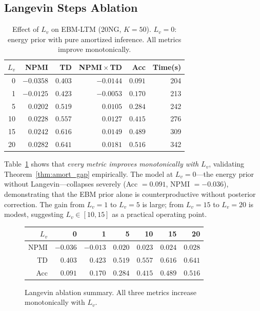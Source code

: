\documentclass[10pt]{article}
\newcommand{\best}[1]{\textbf{#1}}
\begin{document}
\subsection{Langevin Steps Ablation}
\label{sec:langevin_ablation}

\begin{table}[t]
\centering
\caption{Effect of $L_v$ on EBM-LTM (20NG, $K=50$).
    $L_v=0$: energy prior with pure amortized inference. All metrics improve monotonically.}
\label{tab:langevin_ablation}
\small
\begin{tabular}{rrrrrr}
\hline
$L_v$ & \textbf{NPMI} & \textbf{TD} & \textbf{NPMI$\!\times\!$TD} & \textbf{Acc} & \textbf{Time(s)} \\
\hline
0  & $-0.0358$ & $0.403$ & $-0.0144$ & $0.091$ & 204 \\
1  & $-0.0125$ & $0.423$ & $-0.0053$ & $0.170$ & 213 \\
5  & $0.0202$  & $0.519$ & $0.0105$  & $0.284$ & 242 \\
10 & $0.0228$  & $0.557$ & $0.0127$  & $0.415$ & 276 \\
15 & $0.0242$  & $0.616$ & $0.0149$  & $0.489$ & 309 \\
20 & \best{$0.0282$} & \best{$0.641$} & \best{$0.0181$} & \best{$0.516$} & 342 \\
\hline
\end{tabular}
\end{table}

Table~\ref{tab:langevin_ablation} shows that \emph{every metric improves monotonically
with $L_v$}, validating Theorem~\ref{thm:amort_gap} empirically.
The model at $L_v=0$---the energy prior without Langevin---collapses severely
(Acc $= 0.091$, NPMI $= -0.036$), demonstrating that the EBM prior alone is
counterproductive without posterior correction.
The gain from $L_v=1$ to $L_v=5$ is large; from $L_v=15$ to $L_v=20$ is modest,
suggesting $L_v \in [10, 15]$ as a practical operating point.

\begin{figure}[t]
\centering
\small
\begin{tabular}{r|rrrrrr}
\hline
$L_v$ & 0 & 1 & 5 & 10 & 15 & 20 \\
\hline
NPMI  & $-0.036$ & $-0.013$ & $0.020$ & $0.023$ & $0.024$ & $0.028$ \\
TD    & $0.403$  & $0.423$  & $0.519$ & $0.557$ & $0.616$ & $0.641$ \\
Acc   & $0.091$  & $0.170$  & $0.284$ & $0.415$ & $0.489$ & $0.516$ \\
\hline
\end{tabular}
\caption{Langevin ablation summary. All three metrics increase monotonically with $L_v$.}
\label{fig:langevin_trend}
\end{figure}
\end{document}
